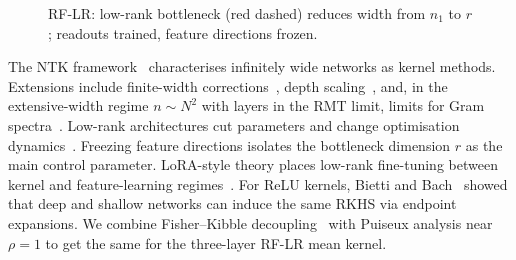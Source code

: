\begin{figure}[htbp]
    \caption{RF-LR: low-rank bottleneck (red dashed) reduces width from \(n_1\) to \(r\); readouts trained, feature directions frozen.}
    \label{fig:RF-LR_architecture}
\end{figure}

The NTK framework~\cite{jacot2018neural} characterises infinitely wide networks as kernel methods. Extensions include finite-width corrections~\cite{arora2019exact,dyer2019asymptoticswidenetworksfeynman}, depth scaling~\cite{yang2019scaling,terjek2022depth}, and, in the extensive-width regime \(n\sim N^2\) with layers in the RMT limit, limits for Gram spectra~\cite{benigni2025eigenvaluedistributionneuraltangent}. Low-rank architectures cut parameters and change optimisation dynamics~\cite{sainath2013low,novikov2015tensorizing,arora2018optimization}. Freezing feature directions isolates the bottleneck dimension \(r\) as the main control parameter. LoRA-style theory places low-rank fine-tuning between kernel and feature-learning regimes~\cite{dayi2024gradientdynamicslowrankfinetuning,jang2024loratrainingntkregime}. For ReLU kernels, Bietti and Bach~\cite{bietti2021deepequalsshallowrelu} showed that deep and shallow networks can induce the same RKHS via endpoint expansions. We combine Fisher--Kibble decoupling~\cite{fisher1915probable,hotelling1953new} with Puiseux analysis near \(\rho=1\) to get the same for the three-layer RF-LR mean kernel.

